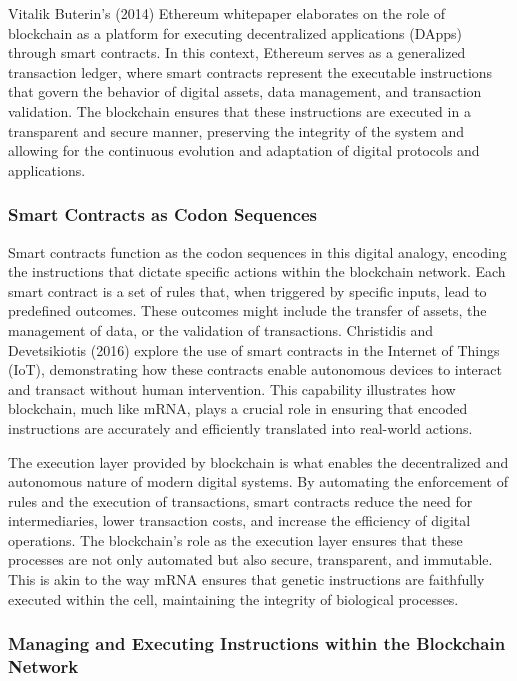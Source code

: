 \documentclass[12pt,twoside]{article}
\begin{document}
Vitalik Buterin’s (2014) Ethereum whitepaper elaborates on the role of blockchain as a platform for executing decentralized applications (DApps) through smart contracts. In this context, Ethereum serves as a generalized transaction ledger, where smart contracts represent the executable instructions that govern the behavior of digital assets, data management, and transaction validation. The blockchain ensures that these instructions are executed in a transparent and secure manner, preserving the integrity of the system and allowing for the continuous evolution and adaptation of digital protocols and applications.

\subsubsection{Smart Contracts as Codon Sequences}

Smart contracts function as the codon sequences in this digital analogy, encoding the instructions that dictate specific actions within the blockchain network. Each smart contract is a set of rules that, when triggered by specific inputs, lead to predefined outcomes. These outcomes might include the transfer of assets, the management of data, or the validation of transactions. Christidis and Devetsikiotis (2016) explore the use of smart contracts in the Internet of Things (IoT), demonstrating how these contracts enable autonomous devices to interact and transact without human intervention. This capability illustrates how blockchain, much like mRNA, plays a crucial role in ensuring that encoded instructions are accurately and efficiently translated into real-world actions.

The execution layer provided by blockchain is what enables the decentralized and autonomous nature of modern digital systems. By automating the enforcement of rules and the execution of transactions, smart contracts reduce the need for intermediaries, lower transaction costs, and increase the efficiency of digital operations. The blockchain’s role as the execution layer ensures that these processes are not only automated but also secure, transparent, and immutable. This is akin to the way mRNA ensures that genetic instructions are faithfully executed within the cell, maintaining the integrity of biological processes.

\subsubsection{Managing and Executing Instructions within the Blockchain Network}
\end{document}
